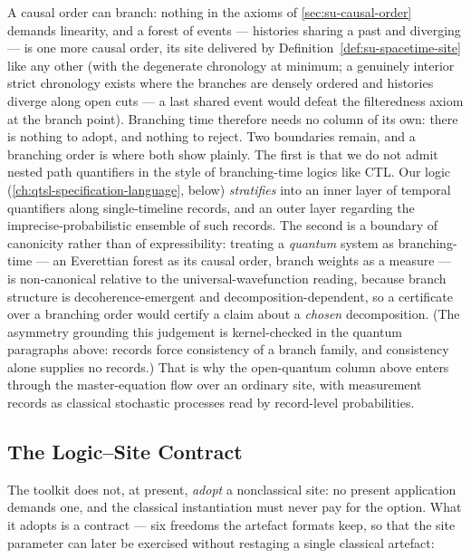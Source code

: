 A causal order can branch: nothing in
the axioms of \autoref{sec:su-causal-order} demands linearity,
and a forest of events --- histories sharing a past and diverging
--- is one more causal order, its site delivered by
Definition~\ref{def:su-spacetime-site} like any other (with the
degenerate chronology at minimum; a genuinely interior strict
chronology exists where the branches are densely ordered and
histories diverge along open cuts --- a last shared event would
defeat the filteredness axiom at the branch point).
Branching
time therefore needs no column of its own: there is nothing to
adopt, and nothing to reject. Two boundaries remain, and a branching
order is where both show plainly. The first is that we do not admit
nested path quantifiers in the style of branching-time logics like
CTL. Our logic (\autoref{ch:qtsl-specification-language}, below)
\emph{stratifies} into an inner layer of temporal quantifiers along
single-timeline records, and an outer layer regarding the
imprecise-probabilistic ensemble of such records. The second is a boundary
of
canonicity rather than of expressibility: treating a \emph{quantum}
system as branching-time --- an Everettian forest as its causal
order, branch weights as a measure --- is non-canonical relative to
the universal-wavefunction reading, because branch structure is
decoherence-emergent and decomposition-dependent, so a certificate
over a branching order would certify a claim about a \emph{chosen}
decomposition. (The asymmetry grounding this judgement is %
kernel-checked in the quantum paragraphs above: records force
consistency of a branch family, and consistency alone supplies no
records.) That is why the open-quantum column above enters
through the master-equation flow over an ordinary site, with
measurement records as classical stochastic processes read by
record-level probabilities.

\subsection{The Logic--Site Contract}

The toolkit does not, at present,
\emph{adopt} a nonclassical site: no present application demands one,
and the classical instantiation must never pay for the option. What
it adopts is a contract --- six freedoms the artefact formats keep,
so that the site parameter can later be exercised without restaging a
single classical artefact:

